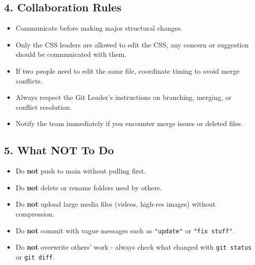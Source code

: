\documentclass[a4paper,12pt]{article}
\begin{document}
\begin{itemize}[leftmargin=1.2cm]
\subsection*{4. Collaboration Rules}
\begin{itemize}[leftmargin=1.2cm]
    \item Communicate before making major structural changes.
    \item Only the CSS leaders are allowed to edit the CSS, any concern or suggestion should be communicated with them.
    \item If two people need to edit the same file, coordinate timing to avoid merge conflicts.
    \item Always respect the Git Leader’s instructions on branching, merging, or conflict resolution.
    \item Notify the team immediately if you encounter merge issues or deleted files.
\end{itemize}

\vspace{0.3cm}
\subsection*{5. What \textbf{NOT} To Do}
\begin{itemize}[leftmargin=1.2cm]
    \item Do \textbf{not} push to main without pulling first.  
    \item Do \textbf{not} delete or rename folders used by others.  
    \item Do \textbf{not} upload large media files (videos, high-res images) without compression.  
    \item Do \textbf{not} commit with vague messages such as \texttt{"update"} or \texttt{"fix stuff"}.  
    \item Do \textbf{not} overwrite others’ work - always check what changed with \texttt{git status} or \texttt{git diff}.
\end{itemize}

\vspace{0.3cm}

\end{itemize}
\end{document}
